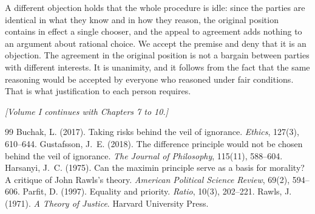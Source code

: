 \documentclass{situationist-preprint}
\begin{document}
A different objection holds that the whole procedure is idle: since the parties are identical in what they know and in how they reason, the original position contains in effect a single chooser, and the appeal to agreement adds nothing to an argument about rational choice. We accept the premise and deny that it is an objection. The agreement in the original position is not a bargain between parties with different interests. It is unanimity, and it follows from the fact that the same reasoning would be accepted by everyone who reasoned under fair conditions. That is what justification to each person requires.

\bigskip
\begin{center}\small\itshape [Volume I continues with Chapters 7 to 10.]\end{center}

\begin{thebibliography}{99}\small
{} Buchak, L. (2017). Taking risks behind the veil of ignorance. \emph{Ethics}, 127(3), 610--644.
 Gustafsson, J.~E. (2018). The difference principle would not be chosen behind the veil of ignorance. \emph{The Journal of Philosophy}, 115(11), 588--604.
 Harsanyi, J.~C. (1975). Can the maximin principle serve as a basis for morality? A critique of John Rawls's theory. \emph{American Political Science Review}, 69(2), 594--606.
 Parfit, D. (1997). Equality and priority. \emph{Ratio}, 10(3), 202--221.
 Rawls, J. (1971). \emph{A Theory of Justice}. Harvard University Press.
\end{thebibliography}
\end{document}

